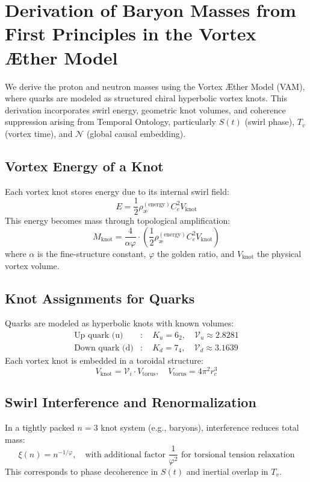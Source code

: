 
\section{Derivation of Baryon Masses from First Principles in the Vortex \AE{}ther Model}

We derive the proton and neutron masses using the Vortex \AE{}ther Model (VAM), where quarks are modeled as structured chiral hyperbolic vortex knots. This derivation incorporates swirl energy, geometric knot volumes, and coherence suppression arising from Temporal Ontology, particularly $S(t)$ (swirl phase), $T_v$ (vortex time), and $\mathcal{N}$ (global causal embedding).

\subsection{Vortex Energy of a Knot}
Each vortex knot stores energy due to its internal swirl field:
\[
E = \frac{1}{2} \rho_\text{\ae}^{(\text{energy})} C_e^2 V_{\text{knot}}
\]
This energy becomes mass through topological amplification:
\[
\boxed{
M_{\text{knot}} = \frac{4}{\alpha \varphi} \cdot \left( \frac{1}{2} \rho_\text{\ae}^{(\text{energy})} C_e^2 V_{\text{knot}} \right)
}
\]
where $\alpha$ is the fine-structure constant, $\varphi$ the golden ratio, and $V_{\text{knot}}$ the physical vortex volume.

\subsection{Knot Assignments for Quarks}
Quarks are modeled as hyperbolic knots with known volumes:
\[
\begin{aligned}
\text{Up quark (u)} &: \quad K_u = 6_2, \quad \mathcal{V}_u \approx 2.8281 \\
\text{Down quark (d)} &: \quad K_d = 7_4, \quad \mathcal{V}_d \approx 3.1639
\end{aligned}
\]
Each vortex knot is embedded in a toroidal structure:
\[
V_{\text{knot}} = \mathcal{V}_i \cdot V_{\text{torus}}, \quad V_{\text{torus}} = 4\pi^2 r_c^3
\]

\subsection{Swirl Interference and Renormalization}
In a tightly packed $n=3$ knot system (e.g., baryons), interference reduces total mass:
\[
\xi(n) = n^{-1/\varphi}, \quad \text{with additional factor } \frac{1}{\varphi^2} \text{ for torsional tension relaxation}
\]
This corresponds to phase decoherence in $S(t)$ and inertial overlap in $T_v$.

